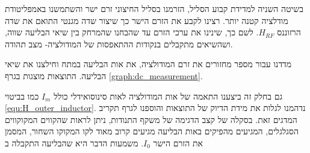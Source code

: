 \documentclass{article}
\begin{document}
בשיטה השניה למדידת קבוע הסליל,  הזרמנו בסליל החיצוני זרם ישר והשתמשנו באמפליטודת מודלציה קטנה יותר.
רצינו לקבע את הזרם הישר כך שיצור שדה מגנטי התואם את שדה הרזוננס
$H_{RF}$.
לשם כך, שינינו את ערכי הזרם עד שהבחנו שהמרחק בין שיאי הבליעה שווה, ושהשיאים מתקבלים בנקודות ההתאפסות של המודולציה- מצב תהודה.

מדדנו עבור מספר מחזורים את זרם המודולציה,
את אות הבליעה במתח וחילצנו את שיאי הבליעה. התוצאות מוצגות בגרף
\ref{graph:dc_measurement}.

\begin{graph}[H]
	\begin{center}
	\resizebox{\textwidth}{!}{}
	\end{center}
	\caption{
	המתח על הסליל החיצוני כתלות בזמן, בזמן בליעה, עבור זרם ישר המוזרם בסליל החיצוני
	}
\label{graph:dc_measurement}
\end{graph}

גם בחלק זה ביצענו התאמה של אות המודולציה לאות סינוסואידלי כולל
$I_m$
כמו בביטוי
\ref{equ:H_outer_inductor}.
נדהמנו לגלות את מידת הדיוק של התוצאות והוספנו לגרף תקריב המדגים זאת. בסקלה של קצב הדגימה של משקף התנודות,
ניתן לראות שהקווים המקוקווים הסגלגלים, המגיעים מהפיקים באות הבליעה מגיעים קרוב מאוד לקו המקוקו השחור, המסמן את הזרם הישר
$I_0$.
משמעות הדבר היא שהבליעה התקבלה ב 

\end{document}

